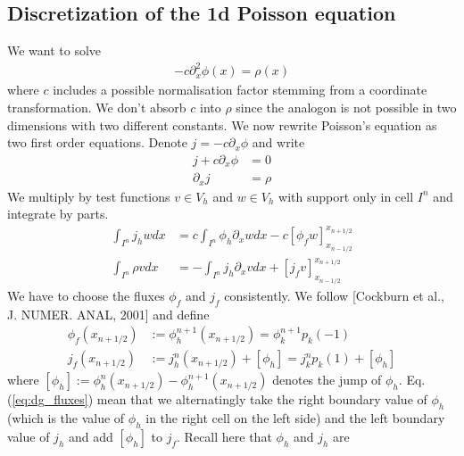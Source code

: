 \documentclass[a4paper,12pt]{scrartcl}
\begin{document}
\subsection{Discretization of the 1d Poisson equation}
We want to solve 
\begin{align}
    -c\partial_x^2\phi(x) = \rho(x)
    \label{eq:1d_poisson}
\end{align}
where $c$ includes a possible normalisation factor stemming 
from a coordinate transformation. We don't absorb $c$ into $\rho$ since
the analogon is not possible in two dimensions with two different constants.
We now rewrite Poisson's equation as two first order equations.
Denote $j = -c\partial_x \phi$ and write
\begin{subequations}
\begin{align}
    j + c\partial_x \phi &= 0\\
    \partial_x j &= \rho 
    \label{eq:poisson}
\end{align}
\end{subequations}
We multiply by test functions $v \in V_h$ and $w \in V_h$ with 
support only in cell $I^n$ and 
integrate by parts.
\begin{subequations}
    \begin{align}
        \int_{I^n} j_h w dx &= c\int_{I^n}\phi_h\partial_x w dx - c[\phi_f w]_{x_{n-1/2}}^{x_{n+1/2}} \\
        \int_{I^n} \rho v dx &= -\int_{I^n} j_h\partial_x v dx + [j_f v]_{x_{n-1/2}}^{x_{n+1/2}}
    \end{align}
    \label{eq:dg_poisson}
\end{subequations}
We have to choose the fluxes $\phi_f$ and $j_f$ consistently.
We follow [Cockburn et al., J. NUMER. ANAL, 2001] and define
\begin{subequations}
\begin{align}
    \phi_f(x_{n+1/2}) &:= \phi_h^{n+1}(x_{n+1/2}) = \phi^{n+1}_kp_k(-1) \\
    j_f(x_{n+1/2}) &:= j_h^n(x_{n+1/2}) + [\phi_h] = j^n_kp_k(1) + [\phi_h] 
    \label{eq:dg_fluxes}
\end{align}
\end{subequations} 
where $[\phi_h] := \phi_h^n(x_{n+1/2})-\phi_h^{n+1}(x_{n+1/2})$ denotes
the jump of $\phi_h$. Eq. (\ref{eq:dg_fluxes}) mean that we alternatingly 
take the right boundary value of $\phi_h$ (which is the value of $\phi_h$ in 
the right cell on the left side) and 
the left boundary value of $j_h$ and add $[\phi_h]$ to $j_f$. 
Recall here that $\phi_h$ and $j_h$ are 
\end{document}

